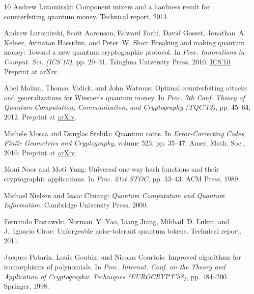 \begin{thebibliography}{10}
{\sc Andrew Lutomirski}: Component mixers and a hardness result for
  counterfeiting quantum money.
\newblock Technical report, 2011.

{\sc Andrew Lutomirski, Scott Aaronson, Edward Farhi, David Gosset, Jonathan~A.
  Kelner, Avinatan Hassidim, and Peter~W. Shor}: Breaking and making quantum
  money: Toward a new quantum cryptographic protocol.
\newblock In {\em Proc. Innovations in Comput. Sci. (ICS'10)}, pp. 20--31.
  Tsinghua University Press, 2010.
\newblock
  \href{http://conference.itcs.tsinghua.edu.cn/ICS2010/papers.html}{ICS'10}.
  Preprint at \href{http://arxiv.org/abs/0912.3825}{arXiv}.

{\sc Abel Molina, Thomas Vidick, and John Watrous}: Optimal counterfeiting
  attacks and generalizations for {W}iesner's quantum money.
\newblock In {\em Proc. 7th Conf. Theory of Quantum Computation, Communication,
  and Cryptography (TQC'12)}, pp. 45--64, 2012.
\newblock Preprint at \href{http://arxiv.org/abs/1202.4010}{arXiv}.
\newblock [\epfmtdoi{10.1007/978-3-642-35656-8\_4}]

{\sc Michele Mosca and Douglas Stebila}: Quantum coins.
\newblock In {\em Error-Correcting Codes, Finite Geometries and Cryptography},
  volume 523, pp. 35--47. Amer. Math. Soc., 2010.
\newblock Preprint at \href{http://arxiv.org/abs/0911.1295}{arXiv}.

{\sc Moni Naor and Moti Yung}: Universal one-way hash functions and their
  cryptographic applications.
\newblock In {\em Proc. 21st STOC}, pp. 33--43. ACM Press, 1989.
\newblock [\epfmtdoi{10.1145/73007.73011}]

{\sc Michael Nielsen and Isaac Chuang}: {\em Quantum Computation and Quantum
  Information}.
\newblock Cambridge University Press, 2000.

{\sc Fernando Pastawski, Norman~Y. Yao, Liang Jiang, Mikhail~D. Lukin, and
  J.~Ignacio Cirac}: Unforgeable noise-tolerant quantum tokens.
\newblock Technical report, 2011.

{\sc Jacques Patarin, Louis Goubin, and Nicolas Courtois}: Improved algorithms
  for isomorphisms of polynomials.
\newblock In {\em Proc. Internat. Conf. on the Theory and Application of
  Cryptographic Techniques (EUROCRYPT'98)}, pp. 184--200. Springer, 1998.


\end{thebibliography}
